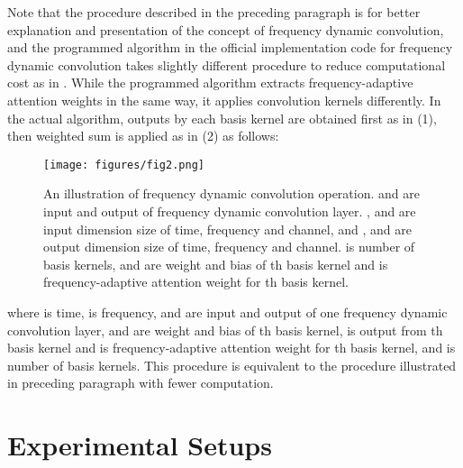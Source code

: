 \documentclass[a4paper]{article}
\begin{document}
Note that the procedure described in the preceding paragraph is for better explanation and presentation of the concept of frequency dynamic convolution, and the programmed algorithm in the official implementation code for frequency dynamic convolution takes slightly different procedure to reduce computational cost as in \cite{tdycnn}. While the programmed algorithm extracts frequency-adaptive attention weights in the same way, it applies convolution kernels differently. In the actual algorithm, outputs by each basis kernel are obtained first as in (1), then weighted sum is applied as in (2) as follows:

\begin{figure}[t]
\centerline{\texttt{[image: figures/fig2.png]}}
\vspace{-5pt}
\caption{An illustration of frequency dynamic convolution operation.  and  are input and output of frequency dynamic convolution layer. ,  and  are input dimension size of time, frequency and channel, and ,  and  are output dimension size of time, frequency and channel.  is number of basis kernels,  and  are weight and bias of th basis kernel and  is frequency-adaptive attention weight for th basis kernel.}
\label{fig:fdyconv}
\vspace{-10pt}
\end{figure}



\noindent
where  is time,  is frequency,  and  are input and output of one frequency dynamic convolution layer,  and  are weight and bias of th basis kernel,  is output from th basis kernel and  is frequency-adaptive attention weight for th basis kernel, and  is number of basis kernels. This procedure is equivalent to the procedure illustrated in preceding paragraph with fewer computation.






 
\vspace{5pt}
\section{Experimental Setups}
\vspace{5pt}
\end{document}
